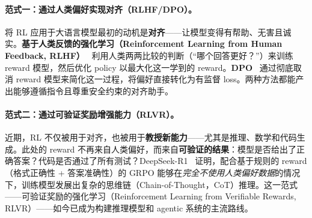 \paragraph{范式一：通过人类偏好实现对齐（RLHF/DPO）。}
将 RL 应用于大语言模型最初的动机是\textbf{对齐}——让模型变得有帮助、无害且诚实。\textbf{基于人类反馈的强化学习（Reinforcement Learning from Human Feedback, RLHF）}~\cite{ouyang2022training, ziegler2019fine, christiano2017deep} 利用人类两两比较的判断（“哪个回答更好？”）来训练 reward 模型，然后优化 policy 以最大化这一学到的 reward。\textbf{DPO}~\cite{rafailov2023direct} 通过彻底取消 reward 模型来简化这一过程，将偏好直接转化为有监督 loss。两种方法都能产出能够遵循指令且尊重安全约束的对齐助手。

\paragraph{范式二：通过可验证奖励增强能力（RLVR）。}
近期，RL 不仅被用于对齐，也被用于\textbf{教授新能力}——尤其是推理、数学和代码生成。此处的 reward 不再来自人类偏好，而来自\textbf{可验证的结果}：模型是否给出了正确答案？代码是否通过了所有测试？DeepSeek-R1~\cite{deepseek2025r1} 证明，配合基于规则的 reward（格式正确性 + 答案准确性）的 GRPO 能够在\emph{完全不使用人类偏好数据}的情况下，训练模型发展出复杂的思维链（Chain-of-Thought，CoT）推理。这一范式——可验证奖励的强化学习（Reinforcement Learning from Verifiable Rewards, RLVR）——如今已成为构建推理模型和 agentic 系统的主流路线。

